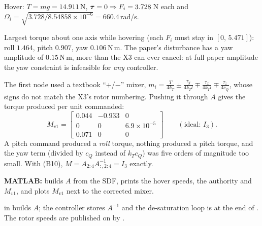 \begin{toybox}
Hover: $T=mg=14.911$\,N, $\bm{\tau}=0\Rightarrow F_i=3.728$\,N each and $\Omega_i=\sqrt{3.728/8.54858\times10^{-6}}=660.4$\,rad/s.

Largest torque about one axis while hovering (each $F_i$ must stay in $[0,\,5.471]$): roll $1.464$, pitch $0.907$, yaw
$\mathbf{0.106}$\,N\,m. The paper's disturbance has a yaw amplitude of $0.15$\,N\,m, more than the X3 can ever cancel: at
full paper amplitude the yaw constraint is infeasible for \emph{any} controller.
\end{toybox}

\begin{toybox}
The first node used a textbook ``+/$-$'' mixer, $m_i=\tfrac{T}{4k_T}\pm\tfrac{\tau_y}{4k_Tl}\mp\tfrac{\tau_x}{4k_Tl}\mp\tfrac{\tau_z}{4c_Q}$,
whose signs do not match the X3's rotor numbering. Pushing it through $A$ gives the torque produced per unit commanded:
\[
M_{v1}=\begin{bmatrix}0.044&-0.933&0\\0&0&6.9\times10^{-5}\\0.071&0&0\end{bmatrix}\qquad(\text{ideal: }I_3).
\]
A pitch command produced a \emph{roll} torque, nothing produced a pitch torque, and the yaw term (divided by $c_Q$ instead
of $k_Tc_Q$) was five orders of magnitude too small. With (B10), $M=A_{2:4}A^{-1}_{:,2:4}=I_3$ exactly.
\end{toybox}

\begin{codebox}
\textbf{MATLAB:}  builds $A$ from the SDF, prints the hover speeds, the authority and
$M_{v1}$, and plots $M_{v1}$ next to the corrected mixer.
\end{codebox}

\begin{projbox}
 in  builds $A$; the controller stores $A^{-1}$ and the de-saturation
loop is at the end of . The rotor speeds are published on
 by .
\end{projbox}
